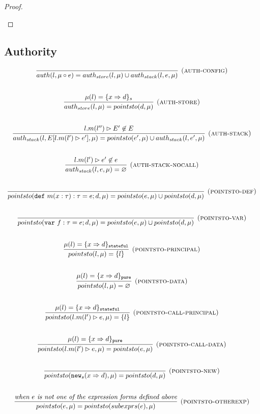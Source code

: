 \documentclass{llncs}
\newcommand{\keywadj}[1]{\mathtt{#1}}
\newcommand{\keyw}[1]{\keywadj{#1}~}
\begin{document}
\begin{proof}
\begin{pcases}
\end{pcases}

\end{proof}

\newpage

\subsection{Authority}

\[
\begin{array}{c}
\infer[\textsc{(auth-config)}]
  {auth(l,\mu \circ e) = auth_{store}(l,\mu) \cup auth_{stack}(l,e,\mu)}
  {}\\[5ex]

\infer[\textsc{(auth-store)}]
  {auth_{store}(l,\mu) = pointsto(d,\mu)}
  {\mu(l) = \{ x \Rightarrow d \}_{s}}\\[5ex]
  
\infer[\textsc{(auth-stack)}]
  {auth_{stack}(l,E[l.m(l') \rhd e'],\mu) = pointsto(e',\mu) \cup auth_{stack}(l,e',\mu)}
  {l.m(l'') \rhd E' \not\in E}\\[5ex]
  
\infer[\textsc{(auth-stack-nocall)}]
  {auth_{stack}(l,e,\mu) = \varnothing}
  {l.m(l') \rhd e' \not\in e}\\[5ex]
  
\infer[\textsc{(pointsto-def)}]
  {pointsto(\keyw{def} m(x:\tau):\tau = e; d,\mu) = pointsto(e,\mu) \cup pointsto(d,\mu)}
  {}\\[5ex]
  
\infer[\textsc{(pointsto-var)}]
  {pointsto(\keyw{var} f:\tau = e; d,\mu) = pointsto(e,\mu) \cup pointsto(d,\mu)}
  {}\\[5ex]
  
\infer[\textsc{(pointsto-principal)}]
  {pointsto(l,\mu) = \{ l \}}
  {\mu(l) = \{ x \Rightarrow d \}_\keywadj{stateful}}\\[5ex]
  
\infer[\textsc{(pointsto-data)}]
  {pointsto(l,\mu) = \varnothing }
  {\mu(l) = \{ x \Rightarrow d \}_\keywadj{pure}}\\[5ex]

\infer[\textsc{(pointsto-call-principal)}]
  {pointsto(l.m(l') \rhd e,\mu) = \{l\} }
  {\mu(l) = \{ x \Rightarrow d \}_\keywadj{stateful}}\\[5ex]
  
\infer[\textsc{(pointsto-call-data)}]
  {pointsto(l.m(l') \rhd e,\mu) = pointsto(e,\mu)}
  {\mu(l) = \{ x \Rightarrow d \}_\keywadj{pure}}\\[5ex]
  
\infer[\textsc{(pointsto-new)}]
  {pointsto(\keywadj{new}_{s}(x \Rightarrow d),\mu) = pointsto(d,\mu) }
  {}\\[5ex]
  
\infer[\textsc{(pointsto-otherexp)}]
  {pointsto(e,\mu) = pointsto(subexprs(e),\mu) }
  {\textit{when $e$ is not one of the expression forms defined above}}\\[5ex]

\end{array}
\]
\end{document}
